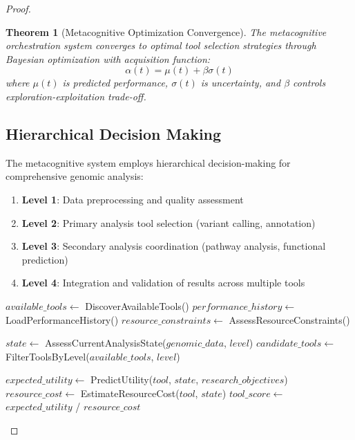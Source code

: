 \documentclass[12pt,a4paper]{article}
\newtheorem{theorem}{Theorem}[section]
\begin{document}
\begin{proof}
\begin{theorem}[Metacognitive Optimization Convergence]
The metacognitive orchestration system converges to optimal tool selection strategies through Bayesian optimization with acquisition function:
\begin{equation}
\alpha(t) = \mu(t) + \beta \sigma(t)
\end{equation}
where $\mu(t)$ is predicted performance, $\sigma(t)$ is uncertainty, and $\beta$ controls exploration-exploitation trade-off.
\end{theorem}

\subsection{Hierarchical Decision Making}

The metacognitive system employs hierarchical decision-making for comprehensive genomic analysis:

\begin{enumerate}
\item \textbf{Level 1}: Data preprocessing and quality assessment
\item \textbf{Level 2}: Primary analysis tool selection (variant calling, annotation)
\item \textbf{Level 3}: Secondary analysis coordination (pathway analysis, functional prediction)
\item \textbf{Level 4}: Integration and validation of results across multiple tools
\end{enumerate}

\begin{algorithm}
\caption{Metacognitive Tool Orchestration}
\begin{algorithmic}
    \State $available\_tools \gets$ DiscoverAvailableTools()
    \State $performance\_history \gets$ LoadPerformanceHistory()
    \State $resource\_constraints \gets$ AssessResourceConstraints()
    
            \State $state \gets$ AssessCurrentAnalysisState($genomic\_data$, $level$)
            \State $candidate\_tools \gets$ FilterToolsByLevel($available\_tools$, $level$)
            
                \State $expected\_utility \gets$ PredictUtility($tool$, $state$, $research\_objectives$)
                \State $resource\_cost \gets$ EstimateResourceCost($tool$, $state$)
                \State $tool\_score \gets$ $expected\_utility$ / $resource\_cost$
            \EndFor
            

\end{algorithmic}
\end{algorithm}
\end{proof}
\end{document}
